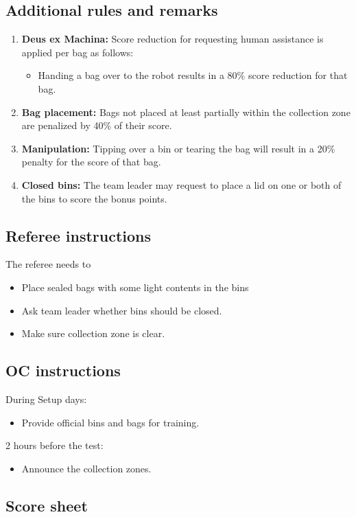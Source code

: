 \subsection{Additional rules and remarks}
\begin{enumerate}[nosep]
	\item \textbf{Deus ex Machina:} Score reduction for requesting human assistance is applied per bag as follows:
	\begin{itemize}[nosep]
		\item Handing a bag over to the robot results in a 80\% score reduction for that bag.
	\end{itemize}

	\item \textbf{Bag placement:} Bags not placed at least partially within the collection zone are penalized by 40\% of their score.
	\item \textbf{Manipulation:}  Tipping over a bin or tearing the bag will result in a 20\% penalty for the score of that bag.
	\item \textbf{Closed bins:} The team leader may request to place a lid on one or both of the bins to score the bonus points.

\end{enumerate}

\subsection{Referee instructions}

The referee needs to
\begin{itemize}
	\item Place sealed bags with some light contents in the bins
	\item Ask team leader whether bins should be closed.
	\item Make sure collection zone is clear.
\end{itemize}

\subsection{OC instructions}
During Setup days:
\begin{itemize}
	\item Provide official bins and bags for training.
\end{itemize}

2 hours before the test:
\begin{itemize}
	\item Announce the collection zones.
\end{itemize}

\newpage
\subsection{Score sheet}



